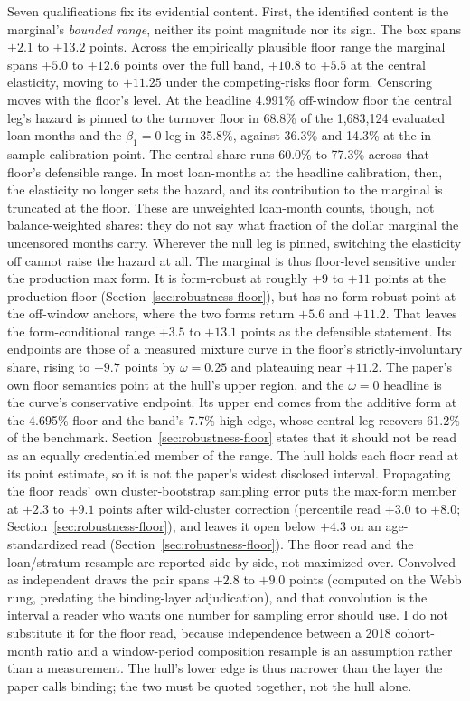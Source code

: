 \documentclass[12pt]{article}
\begin{document}
Seven qualifications fix its evidential content. First, the identified content is the marginal's \emph{bounded range}, neither its point magnitude nor its sign. The box spans $+2.1$ to $+13.2$ points. Across the empirically plausible floor range the marginal spans $+5.0$ to $+12.6$ points over the full band, $+10.8$ to $+5.5$ at the central elasticity, moving to $+11.25$ under the competing-risks floor form. Censoring moves with the floor's level. At the headline 4.991\% off-window floor the central leg's hazard is pinned to the turnover floor in 68.8\% of the 1,683,124 evaluated loan-months and the $\beta_1 = 0$ leg in 35.8\%, against 36.3\% and 14.3\% at the in-sample calibration point. The central share runs 60.0\% to 77.3\% across that floor's defensible range. In most loan-months at the headline calibration, then, the elasticity no longer sets the hazard, and its contribution to the marginal is truncated at the floor. These are unweighted loan-month counts, though, not balance-weighted shares: they do not say what fraction of the dollar marginal the uncensored months carry. Wherever the null leg is pinned, switching the elasticity off cannot raise the hazard at all. The marginal is thus floor-level sensitive under the production max form. It is form-robust at roughly $+9$ to $+11$ points at the production floor (Section~\ref{sec:robustness-floor}), but has no form-robust point at the off-window anchors, where the two forms return $+5.6$ and $+11.2$. That leaves the form-conditional range $+3.5$ to $+13.1$ points as the defensible statement. Its endpoints are those of a measured mixture curve in the floor's strictly-involuntary share, rising to $+9.7$ points by $\omega = 0.25$ and plateauing near $+11.2$. The paper's own floor semantics point at the hull's upper region, and the $\omega = 0$ headline is the curve's conservative endpoint. Its upper end comes from the additive form at the 4.695\% floor and the band's 7.7\% high edge, whose central leg recovers 61.2\% of the benchmark. Section~\ref{sec:robustness-floor} states that it should not be read as an equally credentialed member of the range. The hull holds each floor read at its point estimate, so it is not the paper's widest disclosed interval. Propagating the floor reads' own cluster-bootstrap sampling error puts the max-form member at $+2.3$ to $+9.1$ points after wild-cluster correction (percentile read $+3.0$ to $+8.0$; Section~\ref{sec:robustness-floor}), and leaves it open below $+4.3$ on an age-standardized read (Section~\ref{sec:robustness-floor}). The floor read and the loan/stratum resample are reported side by side, not maximized over. Convolved as independent draws the pair spans $+2.8$ to $+9.0$ points (computed on the Webb rung, predating the binding-layer adjudication), and that convolution is the interval a reader who wants one number for sampling error should use. I do not substitute it for the floor read, because independence between a 2018 cohort-month ratio and a window-period composition resample is an assumption rather than a measurement. The hull's lower edge is thus narrower than the layer the paper calls binding; the two must be quoted together, not the hull alone.
\end{document}
